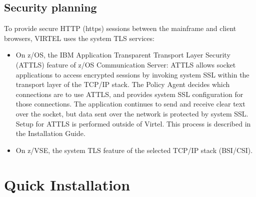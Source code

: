 \documentclass[letterpaper,10pt,english]{sphinxmanual}
\begin{document}
\section{Security planning}
\label{\detokenize{Getting_Started:security-planning}}
\sphinxAtStartPar
To provide secure HTTP (https) sessions between the mainframe and client browsers, VIRTEL uses the system TLS services:
\begin{itemize}
\item {} 
\sphinxAtStartPar
On z/OS, the IBM Application Transparent Transport Layer Security (AT\sphinxhyphen{}TLS) feature of z/OS Communication Server: AT\sphinxhyphen{}TLS allows socket applications to access encrypted sessions by invoking system SSL within the transport layer of the TCP/IP stack. The Policy Agent decides which connections are to use AT\sphinxhyphen{}TLS, and provides system SSL configuration for those connections. The application continues to send and receive clear text over the socket, but data sent over the network is protected by system SSL. Setup for AT\sphinxhyphen{}TLS is performed outside of Virtel. This process is described in the Installation Guide.

\item {} 
\sphinxAtStartPar
On z/VSE, the system TLS feature of the selected TCP/IP stack (BSI/CSI).

\end{itemize}


\chapter{Quick Installation}
\label{\detokenize{Getting_Started:quick-installation}}
\end{document}
